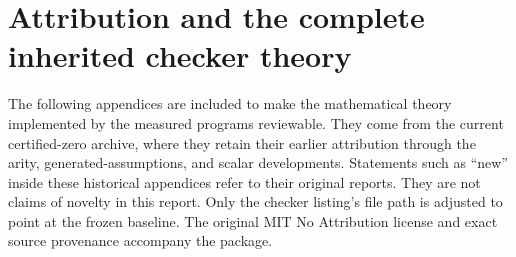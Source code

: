 \documentclass[11pt,letterpaper]{article}
\theoremstyle{definition}\newtheorem{definition}[theorem]{Definition}
\theoremstyle{remark}\newtheorem{remark}[theorem]{Remark}
\begin{document}
\clearpage
\appendix
\section{Attribution and the complete inherited checker theory}
The following appendices are included to make the mathematical theory
implemented by the measured programs reviewable. They come from the
current certified-zero archive, where they retain their earlier
attribution through the arity, generated-assumptions, and scalar
developments. Statements such as ``new'' inside these historical
appendices refer to their original reports. They are not claims of
novelty in this report. Only the checker listing's file path is adjusted
to point at the frozen baseline. The original MIT No Attribution
license and exact source provenance accompany the package.








\end{document}
